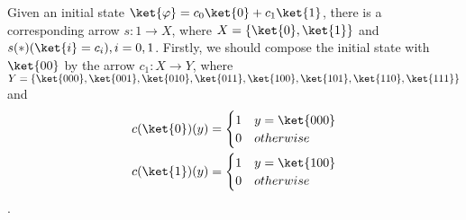\documentclass{llncs}
\begin{document}
Given an initial state $\ket{\varphi}=c_0\ket{0}+c_1\ket{1}$, there is a corresponding arrow $s:1\rightarrow X$, where $X=\{\ket{0},\ket{1}\}$ and $s(\ast)(\ket{i}=c_i), i=0,1$. Firstly, we should compose the initial state with $\ket{00}$ by the arrow $c_1:X\rightarrow Y$, where $Y=\{\ket{000},\ket{001},\ket{010},\ket{011},\ket{100},\ket{101},\ket{110},\ket{111}\}$ and 
$$\begin{aligned}
c(\ket{0})(y)&=\begin{cases} 1 &y=\ket{000}\\ 0 &otherwise\end{cases}\\
c(\ket{1})(y)&=\begin{cases} 1 &y=\ket{100}\\ 0 &otherwise\end{cases}
\end{aligned}
$$. 




\end{document}
